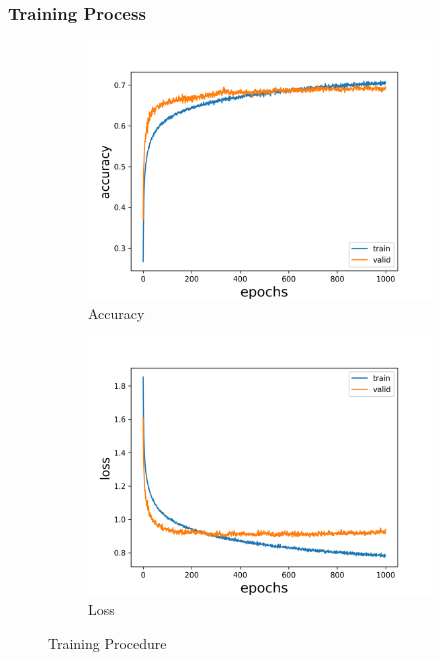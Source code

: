 \documentclass[fleqn,a4paper,12pt]{article}
\begin{document}
\subsubsection*{Training Process}

\begin{figure}[h]
\centering
\begin{subfigure}{.5\textwidth}
  \centering
  \includegraphics[width=\linewidth]{report-imgs/accuracy.png}
  \caption{Accuracy}
  \label{fig:sub1}
\end{subfigure}%
\begin{subfigure}{.5\textwidth}
  \centering
  \includegraphics[width=\linewidth]{report-imgs/loss.png}
  \caption{Loss}
  \label{fig:sub2}
\end{subfigure}
\caption{Training Procedure}
\label{fig:test}
\end{figure}
\end{document}
